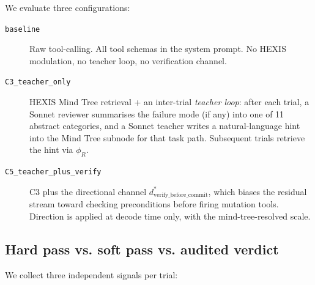 We evaluate three configurations:
\begin{description}
\item[\texttt{baseline}] Raw tool-calling. All tool schemas in the system prompt. No HEXIS modulation, no teacher loop, no verification channel.
\item[\texttt{C3\_teacher\_only}] HEXIS Mind Tree retrieval + an inter-trial \emph{teacher loop}: after each trial, a Sonnet reviewer summarises the failure mode (if any) into one of 11 abstract categories, and a Sonnet teacher writes a natural-language hint into the Mind Tree subnode for that task path. Subsequent trials retrieve the hint via $\phi_R$.
\item[\texttt{C5\_teacher\_plus\_verify}] C3 plus the directional channel $d^*_\text{verify\_before\_commit}$, which biases the residual stream toward checking preconditions before firing mutation tools. Direction is applied at decode time only, with the mind-tree-resolved scale.
\end{description}

\subsection{Hard pass vs. soft pass vs. audited verdict}

We collect three independent signals per trial:

